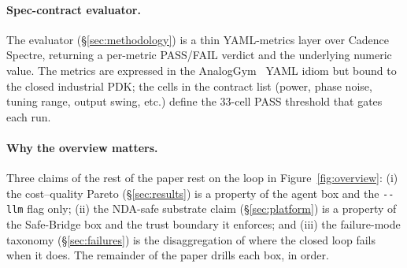 \paragraph{Spec-contract evaluator.}
The evaluator (\S\ref{sec:methodology}) is a thin YAML-metrics
layer over Cadence Spectre, returning a per-metric PASS/FAIL
verdict and the underlying numeric value. The metrics are
expressed in the AnalogGym~\cite{analoggym} YAML idiom but bound
to the closed industrial PDK; the cells in the contract list
(power, phase noise, tuning range, output swing, etc.) define the
33-cell PASS threshold that gates each run.

\paragraph{Why the overview matters.}
Three claims of the rest of the paper rest on the loop in
Figure~\ref{fig:overview}: (i) the cost--quality Pareto
(\S\ref{sec:results}) is a property of the agent box and the
\texttt{-{}-llm} flag only; (ii) the NDA-safe substrate claim
(\S\ref{sec:platform}) is a property of the Safe-Bridge box and
the trust boundary it enforces; and (iii) the failure-mode taxonomy
(\S\ref{sec:failures}) is the disaggregation of where the closed
loop fails when it does. The remainder of the paper drills each
box, in order.
